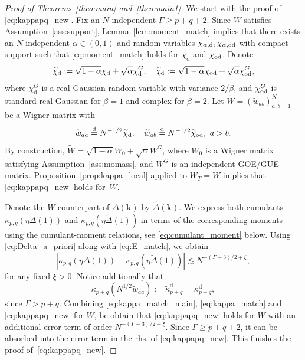 \documentclass[10pt]{amsart}
\numberwithin{equation}{section}
\newcommand{\dif}{\mathrm{d}}
\newcommand{\rd}{\mathrm{d}}
\begin{document}
\begin{proof}[Proof of Theorems~\ref{theo:main} and~\ref{theo:main1}] We start with the proof of \eqref{eq:kappapq_new}. Fix an $N$-independent $\Gamma\ge p+q+2$. Since $W$ satisfies Assumption~\ref{ass:support}, Lemma~\ref{lem:moment_match} implies that there exists an $N$-independent $\alpha\in (0,1)$ and random variables $\chi_{\alpha, \dif}, \chi_{\alpha,{\rm od}}$ with compact support such that \eqref{eq:moment_match} holds for $\chi_\dif$ and $\chi_{\rm od}$. Denote
\begin{equation}
\widetilde{\chi}_\dif := \sqrt{1-\alpha}\chi_\dif + \sqrt{\alpha} \chi^G_\dif,\quad \widetilde{\chi}_\dif := \sqrt{1-\alpha}\chi_{\rm od} + \sqrt{\alpha} \chi^G_{\rm od},
\end{equation}
where $\chi^G_\dif$ is a real Gaussian random variable with variance $2/\beta$, and $\chi^G_{\rm od}$ is standard real Gaussian for $\beta=1$ and complex for $\beta=2$. Let $\widetilde{W}=(\widetilde{w}_{ab})_{a,b=1}^N$ be a Wigner matrix with
\begin{equation*}
\widetilde{w}_{aa}\stackrel{\rd}{=}N^{-1/2}\widetilde{\chi}_{\rm{d}},\quad \widetilde{w}_{ab}\stackrel{\rd}{=}N^{-1/2}\widetilde{\chi}_{\rm{od}},\,\, a>b.
\end{equation*}
By construction, $\widetilde{W}=\sqrt{1-\alpha} W_0+\sqrt{\alpha}W^G$, where $W_0$ is a Wigner matrix satisfying Assumption~\ref{ass:momass}, and $W^G$ is an independent GOE/GUE matrix. Proposition~\ref{prop:kappa_local} applied to $W_T=\widetilde{W}$ implies that \eqref{eq:kappapq_new} holds for~$\widetilde{W}$.

Denote the $\widetilde{W}$-counterpart of $\Delta(\bm{k})$ by $\widetilde{\Delta}(\bm{k})$. We express both cumulants $\kappa_{p,q}(\eta\Delta(1))$ and $\kappa_{p,q}(\eta\widetilde{\Delta}(1))$ in terms of the corresponding moments using the cumulant-moment relations, see \eqref{eq:cumulant_moment} below. Using \eqref{eq:Delta_a_priori} along with \eqref{eq:E_match}, we obtain
\begin{equation}
\left\vert\kappa_{p,q}(\eta\Delta(1))-\kappa_{p,q}(\eta\widetilde{\Delta}(1))\right\vert \lesssim N^{-(\Gamma-3)/2+\xi},
\label{eq:kappa_match_main}
\end{equation}
for any fixed $\xi>0$. Notice additionally that
\begin{equation}
\kappa_{p+q}(N^{1/2}\widetilde{w}_{aa}):=\widetilde{\kappa}^\dif_{p+q}=\kappa^\dif_{p+q},
\label{eq:kappa_match}
\end{equation}
since $\Gamma>p+q$. Combining \eqref{eq:kappa_match_main}, \eqref{eq:kappa_match} and \eqref{eq:kappapq_new} for $\widetilde{W}$, be obtain that \eqref{eq:kappapq_new} holds for $W$ with an additional error term of order $N^{-(\Gamma-3)/2+\xi}$. Since $\Gamma\ge p+q+2$, it can be absorbed into the error term in the rhs. of \eqref{eq:kappapq_new}. This finishes the proof of~\eqref{eq:kappapq_new}.
 

\end{proof}
\end{document}
